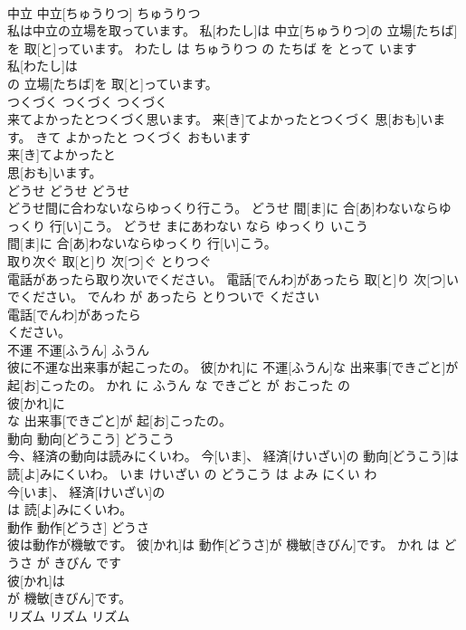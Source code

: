 \documentclass[8pt]{extreport}
\begin{document}
\begin{CJK}{UTF8}{min}
\\	中立	中立[ちゅうりつ]	ちゅうりつ	
\\	私は中立の立場を取っています。	私[わたし]は 中立[ちゅうりつ]の 立場[たちば]を 取[と]っています。	わたし は ちゅうりつ の たちば を とって います	
\\	私[わたし]は
\\	の 立場[たちば]を 取[と]っています。			
\\	つくづく	つくづく	つくづく	
\\	来てよかったとつくづく思います。	来[き]てよかったとつくづく 思[おも]います。	きて よかったと つくづく おもいます	
\\	来[き]てよかったと
\\	思[おも]います。			
\\	どうせ	どうせ	どうせ	
\\	どうせ間に合わないならゆっくり行こう。	どうせ 間[ま]に 合[あ]わないならゆっくり 行[い]こう。	どうせ まにあわない なら ゆっくり いこう	
\\	間[ま]に 合[あ]わないならゆっくり 行[い]こう。			
\\	取り次ぐ	取[と]り 次[つ]ぐ	とりつぐ	
\\	電話があったら取り次いでください。	電話[でんわ]があったら 取[と]り 次[つ]いでください。	でんわ が あったら とりついで ください	
\\	電話[でんわ]があったら
\\	ください。			
\\	不運	不運[ふうん]	ふうん	
\\	彼に不運な出来事が起こったの。	彼[かれ]に 不運[ふうん]な 出来事[できごと]が 起[お]こったの。	かれ に ふうん な できごと が おこった の	
\\	彼[かれ]に
\\	な 出来事[できごと]が 起[お]こったの。			
\\	動向	動向[どうこう]	どうこう	
\\	今、経済の動向は読みにくいわ。	今[いま]、 経済[けいざい]の 動向[どうこう]は 読[よ]みにくいわ。	いま けいざい の どうこう は よみ にくい わ	
\\	今[いま]、 経済[けいざい]の
\\	は 読[よ]みにくいわ。			
\\	動作	動作[どうさ]	どうさ	
\\	彼は動作が機敏です。	彼[かれ]は 動作[どうさ]が 機敏[きびん]です。	かれ は どうさ が きびん です	
\\	彼[かれ]は
\\	が 機敏[きびん]です。			
\\	リズム	リズム	リズム	

\end{CJK}
\end{document}
